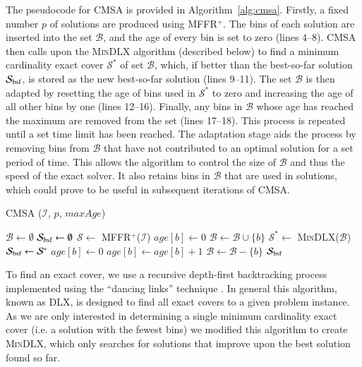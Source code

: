 \documentclass[a4paper,11pt,authoryear]{elsarticle}
\begin{document}
The pseudocode for CMSA is provided in Algorithm~\ref{alg:cmsa}. Firstly, a fixed number $p$ of solutions are produced using MFFR$^+$. The bins of each solution are inserted into the set $\mathcal{B}$, and the age of every bin is set to zero (lines 4--8). CMSA then calls upon the \textsc{MinDLX} algorithm (described below) to find a minimum cardinality exact cover $\mathcal{S}^*$ of set $\mathcal{B}$, which, if better than the best-so-far solution $\mathcal{S}_{\textup{bsf}}$, is stored as the new best-so-far solution (lines 9--11). The set $\mathcal{B}$ is then adapted by resetting the age of bins used in $\mathcal{S}^*$ to zero and increasing the age of all other bins by one (lines 12--16). Finally, any bins in $\mathcal{B}$ whose age has reached the maximum are removed from the set (lines 17--18). This process is repeated until a set time limit has been reached. The adaptation stage aids the process by removing bins from $\mathcal{B}$ that have not contributed to an optimal solution for a set period of time. This allows the algorithm to control the size of $\mathcal{B}$ and thus the speed of the exact solver. It also retains bins in $\mathcal{B}$ that are used in solutions, which could prove to be useful in subsequent iterations of CMSA.

\begin{algorithm}[h!]
\caption{CMSA ($\mathcal{I}$, $p$, $maxAge$)}
\begin{algorithmic}[1]
	\State $\mathcal{B} \gets \emptyset$
	\State $\mathcal{S}_{\textup{bsf}} \gets \emptyset$
			\State $\mathcal{S} \gets$ MFFR$^+$($\mathcal{I}$)
				\State $age[b] \gets 0$
				\State $\mathcal{B} \gets \mathcal{B} \cup \{b\}$
			\EndFor
		\EndFor
		\State $\mathcal{S}^* \gets$ \textsc{MinDLX}($\mathcal{B}$)
			\State $\mathcal{S}_{\textup{bsf}} \gets \mathcal{S}^*$
		\EndIf
				\State $age[b] \gets 0$
				\State $age[b] \gets age[b] + 1$
					\State $\mathcal{B} \gets \mathcal{B} - \{b\}$
				\EndIf
			\EndIf		
		\EndFor
	\EndWhile
	\Return $\mathcal{S}_{\textup{bsf}}$
\end{algorithmic}
\label{alg:cmsa}	
\end{algorithm}	

\noindent To find an exact cover, we use a recursive depth-first backtracking process implemented using the ``dancing links'' technique \cite{knuth2000}. In general this algorithm, known as DLX, is designed to find all exact covers to a given problem instance. As we are only interested in determining a single minimum cardinality exact cover (i.e. a solution with the fewest bins) we modified this algorithm to create \textsc{MinDLX}, which only searches for solutions that improve upon the best solution found so far.
\end{document}
